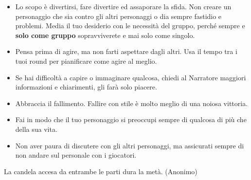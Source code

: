\begin{multicols}{2}
\begin{itemize}[leftmargin=*]
\item
Lo scopo è divertirsi, fare divertire ed assaporare la sfida. Non creare un personaggio che sia contro gli altri personaggi o dia sempre fastidio e problemi. Media il tuo desiderio con le necessità del gruppo, perché sempre e \textbf{solo come gruppo} sopravviverete e mai solo come singolo.

\item
Pensa prima di agire, ma non farti aspettare dagli altri. Usa il tempo tra i tuoi round per pianificare come agire al meglio.

\item
Se hai difficoltà a capire o immaginare qualcosa, chiedi al Narratore maggiori informazioni e chiarimenti, gli farà solo piacere.

\item
Abbraccia il fallimento. Fallire con stile è molto meglio di una noiosa vittoria.

\item
Fai in modo che il tuo personaggio si preoccupi sempre di qualcosa di più che della sua vita.

\item
Non aver paura di discutere con gli altri personaggi, ma assicurati sempre di non andare sul personale con i giocatori.

\end{itemize}

\end{multicols}

\vfill

\begin{enfasi}{
La candela accesa da entrambe le parti dura la metà. (Anonimo)
}\end{enfasi}







\pagebreak


